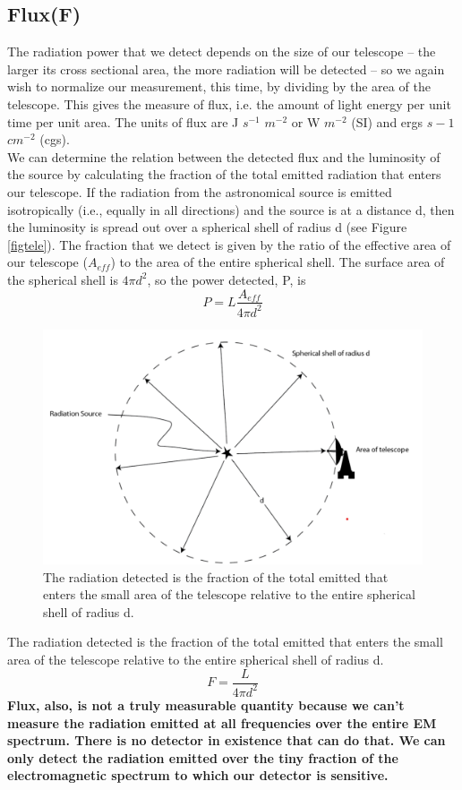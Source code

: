 \documentclass[10pt]{report}
\begin{document}
\subsection{Flux(F)}
The radiation power that we detect depends on the size of our telescope -- the larger its cross sectional area, the more radiation will be detected -- so we again wish to normalize our measurement, this time, by dividing by the area of the telescope. This gives the measure of flux, i.e. the amount of light energy per unit time per unit area. The units of flux are J $s^{-1}$ $m^{-2}$ or W $m^{-2}$ (SI) and ergs $s-1$ $cm^{-2}$ (cgs).   \\
We can determine the relation between the detected flux and the luminosity of the source by calculating the fraction of the total emitted radiation that enters our telescope. If the radiation from the astronomical source is emitted isotropically (i.e., equally in all directions) and the source is at a distance d, then the luminosity is spread out over a spherical shell of radius d (see Figure \ref{figtele}).  The fraction that we detect is given by the ratio of the effective area of our telescope ($A_{eff}$) to the area of the entire spherical shell.  The surface area of the spherical shell is $4 \pi d^2$, so the power detected, P, is 
\begin{equation}
P=L\frac{A_{eff}}{4 \pi d^2}
\end{equation}
\begin{figure}
\includegraphics[width=\linewidth]{figtele.png}
\caption{ The radiation detected is the fraction of the total emitted that enters the small area of the telescope relative to the entire spherical shell of radius d. }
\end{figure}
 The radiation detected is the fraction of the total emitted that enters the small area of the telescope relative to the entire spherical shell of radius d. 
 \begin{equation}
 F=\frac{L}{4\pi d^2}
 \end{equation}
 \textbf{Flux, also, is not a truly measurable quantity because we can't measure the radiation emitted at all frequencies over the entire EM spectrum.  There is no detector in existence that can do that.  We can only detect the radiation emitted over the tiny fraction of the electromagnetic spectrum to which our detector is sensitive.}
\end{document}
